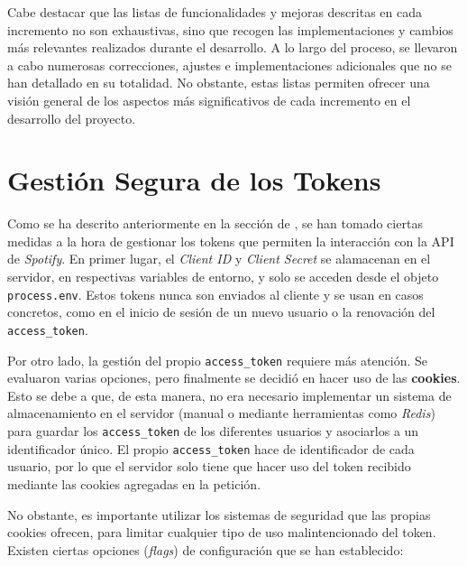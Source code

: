 Cabe destacar que las listas de funcionalidades y mejoras descritas en cada incremento no son exhaustivas, sino que recogen las implementaciones y cambios más relevantes realizados durante el desarrollo. A lo largo del proceso, se llevaron a cabo numerosas correcciones, ajustes e implementaciones adicionales que no se han detallado en su totalidad. No obstante, estas listas permiten ofrecer una visión general de los aspectos más significativos de cada incremento en el desarrollo del proyecto.

\section{Gestión Segura de los Tokens}

Como se ha descrito anteriormente en la sección de , se han tomado ciertas medidas a la hora de gestionar los tokens que permiten la interacción con la API de \textit{Spotify}. En primer lugar, el \textit{Client ID} y \textit{Client Secret} se alamacenan en el servidor, en respectivas variables de entorno, y solo se acceden desde el objeto \texttt{process.env}. Estos tokens nunca son enviados al cliente y se usan en casos concretos, como en el inicio de sesión de un nuevo usuario o la renovación del \texttt{access\_token}.

Por otro lado, la gestión del propio \texttt{access\_token} requiere más atención. Se evaluaron varias opciones, pero finalmente se decidió en hacer uso de las \textbf{cookies}. Esto se debe a que, de esta manera, no era necesario implementar un sistema de almacenamiento en el servidor (manual o mediante herramientas como \textit{Redis}) para guardar los \texttt{access\_token} de los diferentes usuarios y asociarlos a un identificador único. El propio \texttt{access\_token} hace de identificador de cada usuario, por lo que el servidor solo tiene que hacer uso del token recibido mediante las cookies agregadas en la petición.

No obstante, es importante utilizar los sistemas de seguridad que las propias cookies ofrecen, para limitar cualquier tipo de uso malintencionado del token. Existen ciertas opciones (\textit{flags}) de configuración que se han establecido:

